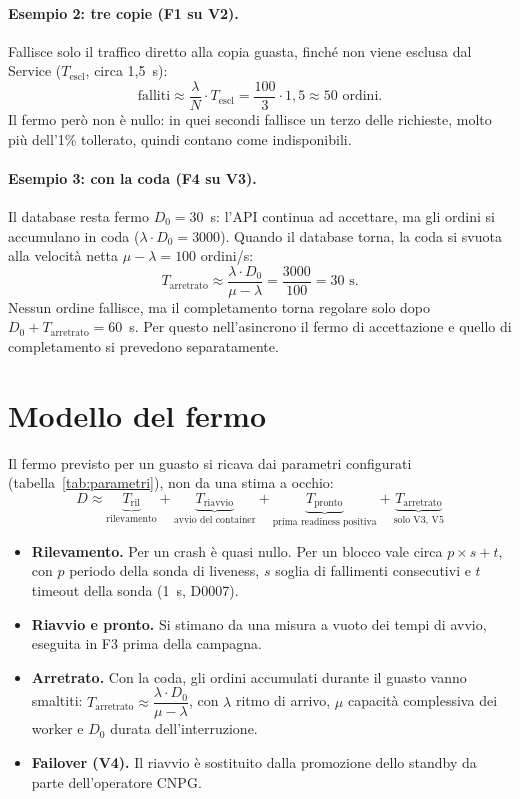 \paragraph{Esempio 2: tre copie (F1 su V2).} Fallisce solo il traffico diretto alla copia guasta, finché non viene esclusa dal Service ($T_{\text{escl}}$, circa 1,5~s):
\[
\text{falliti} \approx \frac{\lambda}{N} \cdot T_{\text{escl}} = \frac{100}{3} \cdot 1{,}5 \approx 50 \text{ ordini.}
\]
Il fermo però non è nullo: in quei secondi fallisce un terzo delle richieste, molto più dell'1\% tollerato, quindi contano come indisponibili.

\paragraph{Esempio 3: con la coda (F4 su V3).} Il database resta fermo $D_0 = 30$~s: l'API continua ad accettare, ma gli ordini si accumulano in coda ($\lambda \cdot D_0 = 3000$). Quando il database torna, la coda si svuota alla velocità netta $\mu - \lambda = 100$ ordini/s:
\[
T_{\text{arretrato}} \approx \frac{\lambda \cdot D_0}{\mu - \lambda} = \frac{3000}{100} = 30 \text{ s.}
\]
Nessun ordine fallisce, ma il completamento torna regolare solo dopo $D_0 + T_{\text{arretrato}} = 60$~s. Per questo nell'asincrono il fermo di accettazione e quello di completamento si prevedono separatamente.

\section{Modello del fermo}

Il fermo previsto per un guasto si ricava dai parametri configurati (tabella~\ref{tab:parametri}), non da una stima a occhio:
\begin{equation}
  D \approx \underbrace{T_{\text{ril}}}_{\text{rilevamento}} + \underbrace{T_{\text{riavvio}}}_{\text{avvio del container}} + \underbrace{T_{\text{pronto}}}_{\text{prima readiness positiva}} + \underbrace{T_{\text{arretrato}}}_{\text{solo V3, V5}}
  \label{eq:fermo}
\end{equation}

\begin{itemize}
  \item \textbf{Rilevamento.} Per un crash è quasi nullo. Per un blocco vale circa $p \times s + t$, con $p$ periodo della sonda di liveness, $s$ soglia di fallimenti consecutivi e $t$ timeout della sonda (1~s, D0007).
  \item \textbf{Riavvio e pronto.} Si stimano da una misura a vuoto dei tempi di avvio, eseguita in F3 prima della campagna.
  \item \textbf{Arretrato.} Con la coda, gli ordini accumulati durante il guasto vanno smaltiti: $T_{\text{arretrato}} \approx \dfrac{\lambda \cdot D_0}{\mu - \lambda}$, con $\lambda$ ritmo di arrivo, $\mu$ capacità complessiva dei worker e $D_0$ durata dell'interruzione.
  \item \textbf{Failover (V4).} Il riavvio è sostituito dalla promozione dello standby da parte dell'operatore CNPG.
\end{itemize}

